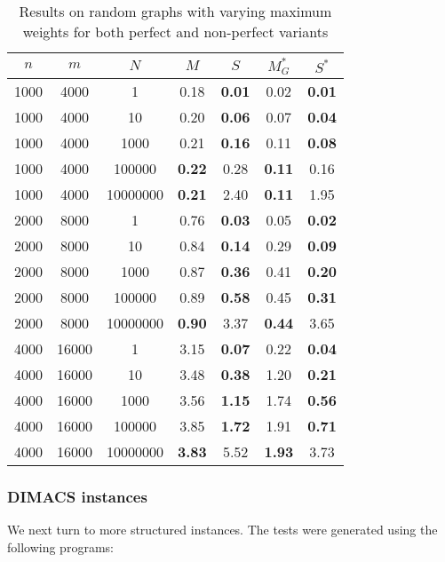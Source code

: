 \begin{table}
\centering
\begin{tabular}{ccc|cc|cc}
$n$ & $m$ & $N$ & $M$ & $S$ & $M^*_G$ & $S^*$ \\
\hline
1000 & 4000 & 1 & 0.18 & \textbf{0.01} & 0.02 & \textbf{0.01} \\
1000 & 4000 & 10 & 0.20 & \textbf{0.06} & 0.07 & \textbf{0.04} \\
1000 & 4000 & 1000 & 0.21 & \textbf{0.16} & 0.11 & \textbf{0.08} \\
1000 & 4000 & 100000 & \textbf{0.22} & 0.28 & \textbf{0.11} & 0.16 \\
1000 & 4000 & 10000000 & \textbf{0.21} & 2.40 & \textbf{0.11} & 1.95 \\
2000 & 8000 & 1 & 0.76 & \textbf{0.03} & 0.05 & \textbf{0.02} \\
2000 & 8000 & 10 & 0.84 & \textbf{0.14} & 0.29 & \textbf{0.09} \\
2000 & 8000 & 1000 & 0.87 & \textbf{0.36} & 0.41 & \textbf{0.20} \\
2000 & 8000 & 100000 & 0.89 & \textbf{0.58} & 0.45 & \textbf{0.31} \\
2000 & 8000 & 10000000 & \textbf{0.90} & 3.37 & \textbf{0.44} & 3.65 \\
4000 & 16000 & 1 & 3.15 & \textbf{0.07} & 0.22 & \textbf{0.04} \\
4000 & 16000 & 10 & 3.48 & \textbf{0.38} & 1.20 & \textbf{0.21} \\
4000 & 16000 & 1000 & 3.56 & \textbf{1.15} & 1.74 & \textbf{0.56} \\
4000 & 16000 & 100000 & 3.85 & \textbf{1.72} & 1.91 & \textbf{0.71} \\
4000 & 16000 & 10000000 & \textbf{3.83} & 5.52 & \textbf{1.93} & 3.73 \\
\end{tabular}
\caption{Results on random graphs with varying maximum weights for both perfect and non-perfect variants}\label{tab:weight}
\end{table}

\subsubsection*{DIMACS instances}

We next turn to more structured instances. The tests were generated using the following programs:

